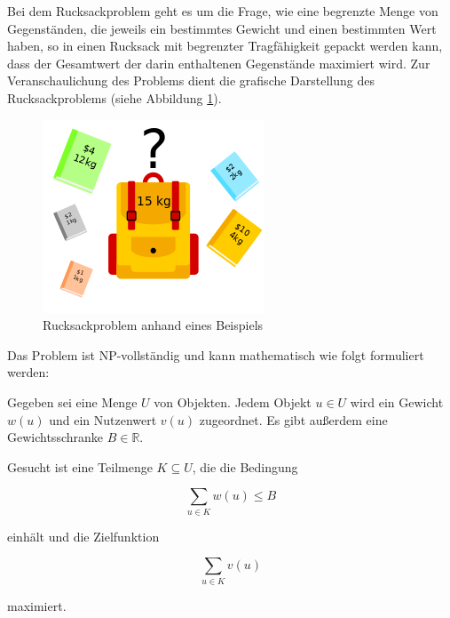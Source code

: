 \documentclass[12pt]{report}
\begin{document}


Bei dem Rucksackproblem geht es um die Frage, wie eine begrenzte Menge von Gegenständen, die jeweils ein bestimmtes Gewicht und einen bestimmten Wert haben, so in einen Rucksack mit begrenzter Tragfähigkeit gepackt werden kann, dass der Gesamtwert der darin enthaltenen Gegenstände maximiert wird. Zur Veranschaulichung des Problems dient die grafische Darstellung des Rucksackproblems (siehe Abbildung \ref{fig:rucksackproblem}). 

\begin{figure}[h]
	\centering
	\includegraphics[width=0.5 \linewidth]{Knapsack_Problem_Illustration}
	\caption{Rucksackproblem anhand eines Beispiels \cite{VectorVoyager2023knapsack}}
	\label{fig:rucksackproblem}
\end{figure}

Das Problem ist NP-vollständig und kann mathematisch wie folgt formuliert werden:

Gegeben sei eine Menge $U$ von Objekten. Jedem Objekt $u \in U$ wird ein Gewicht $w(u)$ und ein Nutzenwert $v(u)$ zugeordnet. Es gibt außerdem eine Gewichtsschranke $B \in \mathbb{R}$.

Gesucht ist eine Teilmenge $K \subseteq U$, die die Bedingung

$$\sum_{u \in K} w(u) \leq B$$

einhält und die Zielfunktion

$$\sum_{u \in K} v(u)$$

maximiert. \cite{kellerer2004knapsack}

\end{document}
